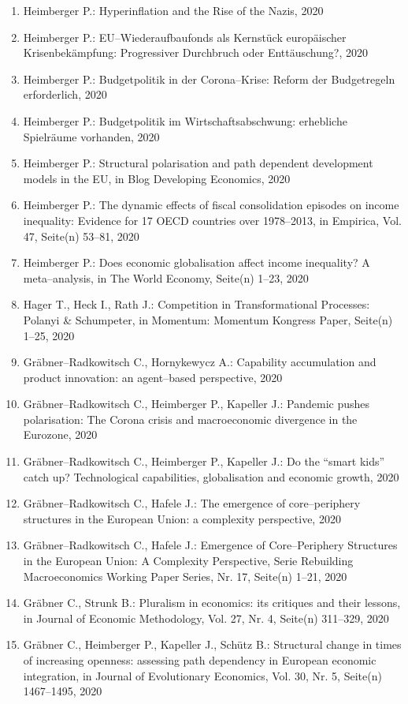 \begin{enumerate}
	 \item Heimberger P.: Hyperinflation and the Rise of the Nazis, 2020
	 \item Heimberger P.: EU--Wiederaufbaufonds als Kernstück europäischer Krisenbekämpfung: Progressiver Durchbruch oder Enttäuschung?, 2020
	 \item Heimberger P.: Budgetpolitik in der Corona--Krise: Reform der Budgetregeln erforderlich, 2020
	 \item Heimberger P.: Budgetpolitik im Wirtschaftsabschwung: erhebliche Spielräume vorhanden, 2020
	 \item Heimberger P.: Structural polarisation and path dependent development models in the EU, in Blog Developing Economics, 2020
	 \item Heimberger P.: The dynamic effects of fiscal consolidation episodes on income inequality: Evidence for 17 OECD countries over 1978--2013, in Empirica, Vol. 47, Seite(n) 53--81, 2020
	 \item Heimberger P.: Does economic globalisation affect income inequality? A meta--analysis, in The World Economy, Seite(n) 1--23, 2020
	 \item Hager T., Heck I., Rath J.: Competition in Transformational Processes: Polanyi \& Schumpeter, in Momentum: Momentum Kongress Paper, Seite(n) 1--25, 2020
	 \item Gräbner--Radkowitsch C., Hornykewycz A.: Capability accumulation and product innovation: an agent--based perspective, 2020
	 \item Gräbner--Radkowitsch C., Heimberger P., Kapeller J.: Pandemic pushes polarisation: The Corona crisis and macroeconomic divergence in the Eurozone, 2020
	 \item Gräbner--Radkowitsch C., Heimberger P., Kapeller J.: Do the “smart kids” catch up? Technological capabilities, globalisation and economic growth, 2020
	 \item Gräbner--Radkowitsch C., Hafele J.: The emergence of core--periphery structures in the European Union: a complexity perspective, 2020
	 \item Gräbner--Radkowitsch C., Hafele J.: Emergence of Core--Periphery Structures in the European Union: A Complexity Perspective, Serie Rebuilding Macroeconomics Working Paper Series, Nr. 17, Seite(n) 1--21, 2020
	 \item Gräbner C., Strunk B.: Pluralism in economics: its critiques and their lessons, in Journal of Economic Methodology, Vol. 27, Nr. 4, Seite(n) 311--329, 2020
	 \item Gräbner C., Heimberger P., Kapeller J., Schütz B.: Structural change in times of increasing openness: assessing path dependency in European economic integration, in Journal of Evolutionary Economics, Vol. 30, Nr. 5, Seite(n) 1467--1495, 2020

\end{enumerate}
